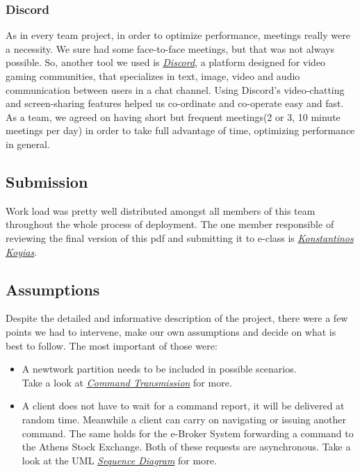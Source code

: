 \documentclass{article}
\begin{document}
\subsubsection{Discord}
As in every team project, in order to optimize performance, meetings really were a necessity. We sure had some face-to-face meetings, but that was not always possible. So, another tool we used is \href{https://discordapp.com/}{\underline{\emph{Discord}}}, a platform designed for video gaming communities, that specializes in text, image, video and audio communication between users in a chat channel. Using Discord's video-chatting and screen-sharing features helped us co-ordinate and co-operate easy and fast. As a team, we agreed on having short but frequent meetings(2 or 3, 10 minute meetings per day) in order to take full advantage of time, optimizing performance in general.

\subsection{Submission}
Work load was pretty well distributed amongst all members of this team throughout the whole process of deployment. The one member responsible of reviewing the final version of this pdf and submitting it to e-class is{\hypersetup{
    colorlinks=true,
    urlcolor=black,    
}
\href{https://github.com/KostasKoyias}{\emph{Konstantinos Koyias}}}.  

\newpage
\subsection{Assumptions}
Despite the detailed and informative description of the project, there were a few points we had to intervene, make our own assumptions and decide on what is best to follow. The most important of those were:
\begin{itemize}
\item A newtwork partition needs to be included in possible scenarios.\\
Take a look at {\hypersetup{
    colorlinks=true,
    linkcolor=blue,    
}\hyperlink{CmdTrns}{\textit{Command Transmission}}} for more. 
\item A client does not have to wait for a command report, it will be delivered at random time. Meanwhile a client can
carry on navigating or issuing another command. The same holds for the e-Broker System forwarding a command to the
Athens Stock Exchange. Both of these requests are asynchronous. Take a look at the UML {\hypersetup{
    colorlinks=true,
    linkcolor=blue,    
}\hyperlink{Asynchronous}{\textit{Sequence Diagram}}} for more.
\end{itemize} 
\end{document}
